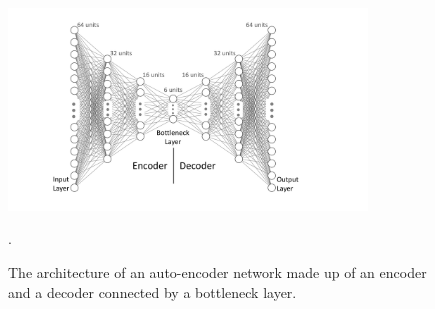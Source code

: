 \documentclass[xcolor={table}]{beamer}
\begin{document}
 \begin{frame} 
\begin{figure}[htb]
       \begin{centering}
       \includegraphics[width=0.85\textwidth]{images/fmlpda_figure_10_14.pdf}
       \caption{The architecture of an auto-encoder network made up of an encoder and a decoder connected by a bottleneck layer.}.
       \label{fig:autoencoder_architecture}
       \end{centering}
\end{figure}
\end{frame} 
\end{document}
